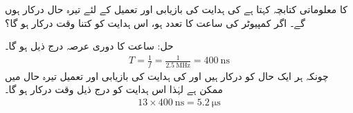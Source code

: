  کا معلوماتی کتابچہ  کہتا ہے  کی ہدایت  کی بازیابی اور تعمیل کے لئے تیرہ  حال درکار ہوں گے۔ اگر کمپیوٹر کی ساعت کا تعدد  ہو، اس  ہدایت کو کتنا وقت درکار ہو گا؟

حل:\quad
ساعت کا دوری عرصہ درج ذیل ہو گا۔
\begin{align*}
T=\frac{1}{f}=\frac{1}{\SI{2.5}{\mega\hertz}}=\SI{400}{\nano\second}
\end{align*}
چونکہ  ہر ایک  حال کو    درکار ہیں  اور  کی ہدایت کی بازیابی اور تعمیل   تیرہ  حال    میں  ممکن  ہے لہٰذا اس ہدایت کو درج ذیل وقت درکار ہو گا۔
\begin{align*}
13\times \SI{400}{\nano\second}=\SI{5.2}{\micro\second}
\end{align*}
